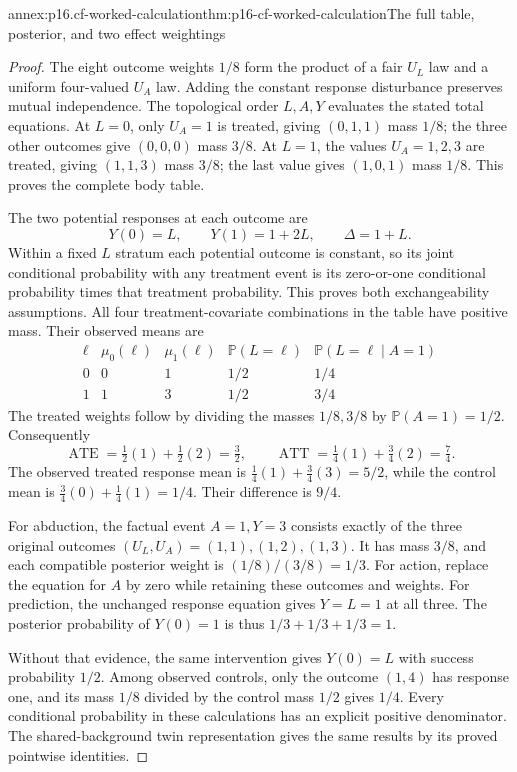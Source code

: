 \begin{annexitem}{annex:p16.cf-worked-calculation}{thm:p16-cf-worked-calculation}{The full table, posterior, and two effect weightings}
\begin{proof}
The eight outcome weights \(1/8\) form the product of a fair
\(U_L\) law and a uniform four-valued \(U_A\) law. Adding the
constant response disturbance preserves mutual independence. The
topological order \(L,A,Y\) evaluates the stated total equations.
At \(L=0\), only \(U_A=1\) is treated, giving \((0,1,1)\)
mass \(1/8\); the three other outcomes give \((0,0,0)\) mass
\(3/8\). At \(L=1\), the values \(U_A=1,2,3\) are treated,
giving \((1,1,3)\) mass \(3/8\); the last value gives
\((1,0,1)\) mass \(1/8\). This proves the complete body table.

The two potential responses at each outcome are
\[
 Y(0)=L,\qquad Y(1)=1+2L,
 \qquad\Delta=1+L.
\]
Within a fixed \(L\) stratum each potential outcome is constant,
so its joint conditional probability with any treatment event is
its zero-or-one conditional probability times that treatment
probability. This proves both exchangeability assumptions. All four
treatment-covariate combinations in the table have positive mass.
Their observed means are
\[
\begin{array}{c|cc|cc}
 \ell&\mu_0(\ell)&\mu_1(\ell)&\mathbb P(L=\ell)&
                         \mathbb P(L=\ell\mid A=1)\\\hline
 0&0&1&1/2&1/4\\
 1&1&3&1/2&3/4
\end{array}
\]
The treated weights follow by dividing the masses \(1/8,3/8\)
by \(\mathbb P(A=1)=1/2\). Consequently
\[
 \operatorname{ATE}=\tfrac12(1)+\tfrac12(2)=\tfrac32,
 \qquad
 \operatorname{ATT}=\tfrac14(1)+\tfrac34(2)=\tfrac74.
\]
The observed treated response mean is
\(\frac14(1)+\frac34(3)=5/2\), while the control mean is
\(\frac34(0)+\frac14(1)=1/4\). Their difference is \(9/4\).

For abduction, the factual event \(A=1,Y=3\) consists exactly
of the three original outcomes \((U_L,U_A)=(1,1),(1,2),(1,3)\).
It has mass \(3/8\), and each compatible posterior weight is
\((1/8)/(3/8)=1/3\). For action, replace the equation for
\(A\) by zero while retaining these outcomes and weights. For
prediction, the unchanged response equation gives \(Y=L=1\)
at all three. The posterior probability of \(Y(0)=1\) is thus
\(1/3+1/3+1/3=1\).

Without that evidence, the same intervention gives \(Y(0)=L\)
with success probability \(1/2\). Among observed controls, only
the outcome \((1,4)\) has response one, and its mass \(1/8\)
divided by the control mass \(1/2\) gives \(1/4\). Every
conditional probability in these calculations has an explicit
positive denominator. The shared-background twin representation
gives the same results by its proved pointwise identities.
\end{proof}
\end{annexitem}

